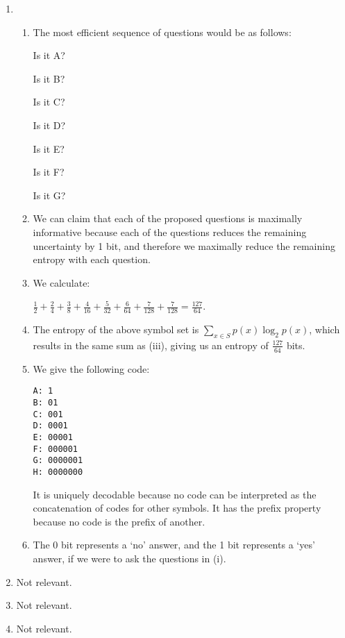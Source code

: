 


\begin{enumerate}[label=(\alph*)]
  \item

  \begin{enumerate}[label=(\roman*)]
    \item
      The most efficient sequence of questions would be as follows:

      Is it A?

      Is it B?

      Is it C?

      Is it D?

      Is it E?

      Is it F?

      Is it G?

    \item
      We can claim that each of the proposed questions is maximally informative because each of the questions reduces the remaining uncertainty by 1 bit, and therefore we maximally reduce the remaining entropy with each question.

    \item
      We calculate:

      $\frac{1}{2}  + \frac{2}{4} + \frac{3}{8} + \frac{4}{16} + \frac{5}{32} + \frac{6}{64} + \frac{7}{128} + \frac{7}{128} = \frac{127}{64}$.

    \item
      The entropy of the above symbol set is $\sum_{x \in S} p(x)\log_2 p(x)$, which results in the same sum as (iii), giving us an entropy of $\frac{127}{64}$ bits.

    \item
      We give the following code:

\begin{verbatim}
A: 1
B: 01
C: 001
D: 0001
E: 00001
F: 000001
G: 0000001
H: 0000000
\end{verbatim}

It is uniquely decodable because no code can be interpreted as the concatenation of codes for other symbols. It has the prefix property because no code is the prefix of another.

\item
  The 0 bit represents a `no' answer, and the 1 bit represents a `yes' answer, if we were to ask the questions in (i).
      
  \end{enumerate}

\item
  Not relevant.

\item
  Not relevant.

\item
  Not relevant.
        
    \end{enumerate}

